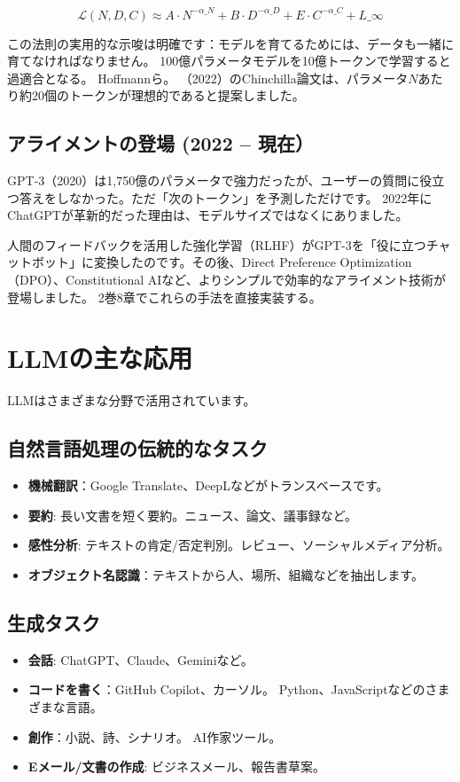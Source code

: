 \[
\mathcal{L}(N, D, C) \approx A \cdot N^{-\alpha\_N} + B \cdot D^{-\alpha\_D} + E \cdot C^{-\alpha\_C} + L\_\infty
\]

この法則の実用的な示唆は明確です：モデルを育てるためには、データも一緒に育てなければなりません。 100億パラメータモデルを10億トークンで学習すると過適合となる。 Hoffmannら。 （2022）のChinchilla論文は、パラメータ$N$あたり約20個のトークンが理想的であると提案しました。

\subsection{アライメントの登場 (2022  --  現在）}

GPT-3（2020）は1,750億のパラメータで強力だったが、ユーザーの質問に役立つ答えをしなかった。ただ「次のトークン」を予測しただけです。 2022年にChatGPTが革新的だった理由は、モデルサイズではなくにありました。

人間のフィードバックを活用した強化学習（RLHF）がGPT-3を「役に立つチャットボット」に変換したのです。その後、Direct Preference Optimization（DPO）、Constitutional AIなど、よりシンプルで効率的なアライメント技術が登場しました。 2巻8章でこれらの手法を直接実装する。

\section{LLMの主な応用}

LLMはさまざまな分野で活用されています。

\subsection{自然言語処理の伝統的なタスク}
\begin{itemize}
\item\textbf{機械翻訳}：Google Translate、DeepLなどがトランスベースです。
\item\textbf{要約}: 長い文書を短く要約。ニュース、論文、議事録など。
\item\textbf{感性分析}: テキストの肯定/否定判別。レビュー、ソーシャルメディア分析。
\item\textbf{オブジェクト名認識}：テキストから人、場所、組織などを抽出します。
\end{itemize}

\subsection{生成タスク}
\begin{itemize}
\item\textbf{会話}: ChatGPT、Claude、Geminiなど。
\item\textbf{コードを書く}：GitHub Copilot、カーソル。 Python、JavaScriptなどのさまざまな言語。
\item\textbf{創作}：小説、詩、シナリオ。 AI作家ツール。
\item\textbf{Eメール/文書の作成}: ビジネスメール、報告書草案。
\end{itemize}

